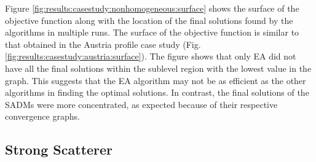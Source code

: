 			
			Figure \ref{fig:results:casestudy:nonhomogeneous:surface} shows the surface of the objective function along with the location of the final solutions found by the algorithms in multiple runs. The surface of the objective function is similar to that obtained in the Austria profile case study (Fig. \ref{fig:results:casestudy:austria:surface}). The figure shows that only EA did not have all the final solutions within the sublevel region with the lowest value in the graph. This suggests that the EA algorithm may not be as efficient as the other algorithms in finding the optimal solutions. In contrast, the final solutions of the SADMs were more concentrated, as expected because of their respective convergence graphs.
		
		\subsection{Strong Scatterer}\label{chap:results:casestudy:strong}
		
			
